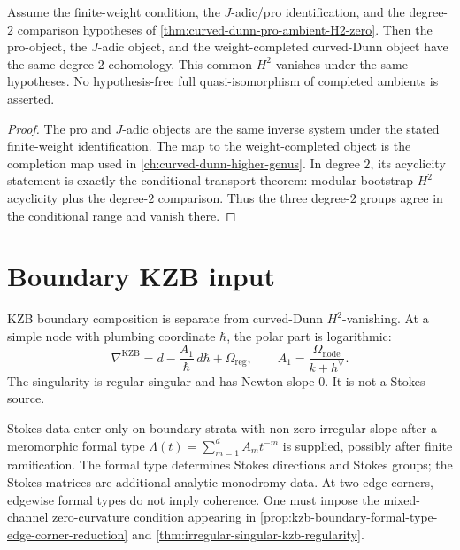 \begin{proposition}
\label{prop:three-ambients-equivalent}
Assume the finite-weight condition, the \(J\)-adic/pro
identification, and the degree-\(2\) comparison hypotheses of
\autoref{thm:curved-dunn-pro-ambient-H2-zero}. Then the pro-object,
the \(J\)-adic object, and the weight-completed curved-Dunn object
have the same degree-\(2\) cohomology. This common \(H^{2}\) vanishes
under the same hypotheses. No hypothesis-free full quasi-isomorphism
of completed ambients is asserted.
\end{proposition}

\begin{proof}
The pro and \(J\)-adic objects are the same inverse system under the
stated finite-weight identification. The map to the
weight-completed object is the completion map used in
\autoref{ch:curved-dunn-higher-genus}. In degree \(2\), its
acyclicity statement is exactly the conditional transport theorem:
modular-bootstrap \(H^{2}\)-acyclicity plus the degree-\(2\)
comparison. Thus the three degree-\(2\) groups agree in the
conditional range and vanish there.
\end{proof}

\section{Boundary KZB input}
\label{sec:kzb-boundary-input-raw}

\begin{remark}
KZB boundary composition is separate from curved-Dunn
\(H^{2}\)-vanishing. At a simple node with plumbing coordinate
\(\hbar\), the polar part is logarithmic:
\[
 \nabla^{\mathrm{KZB}}
 =
 d-\frac{A_{1}}{\hbar}\,d\hbar+\Omega_{\mathrm{reg}},
 \qquad
 A_{1}=\frac{\Omega_{\mathrm{node}}}{k+h^{\vee}}.
\]
The singularity is regular singular and has Newton slope \(0\).
It is not a Stokes source.

Stokes data enter only on boundary strata with non-zero irregular
slope after a meromorphic formal type
\(\Lambda(t)=\sum_{m=1}^{d}A_{m}t^{-m}\) is supplied, possibly after
finite ramification. The formal type determines Stokes directions
and Stokes groups; the Stokes matrices are additional analytic
monodromy data. At two-edge corners, edgewise formal types do not
imply coherence. One must impose the mixed-channel zero-curvature
condition appearing in
\autoref{prop:kzb-boundary-formal-type-edge-corner-reduction} and
\autoref{thm:irregular-singular-kzb-regularity}.
\end{remark}

